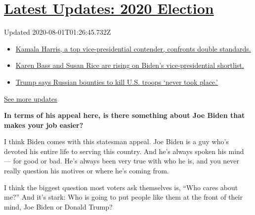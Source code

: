 \hypertarget{latest-updates-2020-election}{%
\section{\texorpdfstring{\href{https://www.nytimes.com/2020/07/31/us/elections/biden-vs-trump.html?action=click\&pgtype=Article\&state=default\&region=MAIN_CONTENT_1\&context=storylines_live_updates}{Latest
Updates: 2020
Election}}{Latest Updates: 2020 Election}}\label{latest-updates-2020-election}}

Updated 2020-08-01T01:26:45.732Z

\begin{itemize}
\tightlist
\item
  \href{https://www.nytimes.com/2020/07/31/us/elections/biden-vs-trump.html?action=click\&pgtype=Article\&state=default\&region=MAIN_CONTENT_1\&context=storylines_live_updates\#link-29fdff45}{Kamala
  Harris, a top vice-presidential contender, confronts double
  standards.}
\item
  \href{https://www.nytimes.com/2020/07/31/us/elections/biden-vs-trump.html?action=click\&pgtype=Article\&state=default\&region=MAIN_CONTENT_1\&context=storylines_live_updates\#link-13ec3d9c}{Karen
  Bass and Susan Rice are rising on Biden's vice-presidential
  shortlist.}
\item
  \href{https://www.nytimes.com/2020/07/31/us/elections/biden-vs-trump.html?action=click\&pgtype=Article\&state=default\&region=MAIN_CONTENT_1\&context=storylines_live_updates\#link-49e9a016}{Trump
  says Russian bounties to kill U.S. troops `never took place.'}
\end{itemize}

\href{https://www.nytimes.com/2020/07/31/us/elections/biden-vs-trump.html?action=click\&pgtype=Article\&state=default\&region=MAIN_CONTENT_1\&context=storylines_live_updates}{See
more updates}

\textbf{In terms of his appeal here, is there something about Joe Biden
that makes your job easier?}

I think Biden comes with this statesman appeal. Joe Biden is a guy who's
devoted his entire life to serving this country. And he's always spoken
his mind --- for good or bad. He's always been very true with who he is,
and you never really question his motives or where he's coming from.

I think the biggest question most voters ask themselves is, ``Who cares
about me?'' And it's stark: Who is going to put people like them at the
front of their mind, Joe Biden or Donald Trump?

